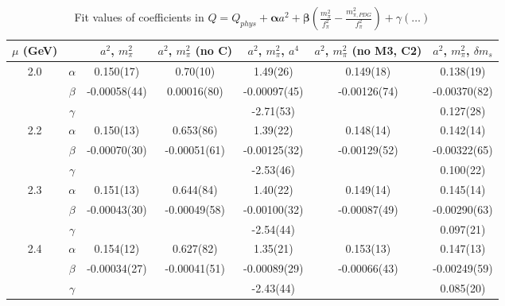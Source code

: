\documentclass[12pt]{extarticle}
\begin{document}
\begin{table}[h!]
\begin{center}
\begin{tabular}{|c c|c|c|c|c|c|}
\hline
$\mu$ (GeV) &  & $a^2$, $m_\pi^2$& $a^2$, $m_\pi^2$ (no C)& $a^2$, $m_\pi^2$, $a^4$& $a^2$, $m_\pi^2$ (no M3, C2)& $a^2$, $m_\pi^2$, $\delta m_s$\\
\hline
\multirow{3}{0.5in}{2.0} & $\alpha$ & 0.150(17)& 0.70(10)& 1.49(26)& 0.149(18)& 0.138(19)\\
 & $\beta$ & -0.00058(44)& 0.00016(80)& -0.00097(45)& -0.00126(74)& -0.00370(82)\\
 & $\gamma$ &  &  & -2.71(53)&  & 0.127(28)\\
\hline
\multirow{3}{0.5in}{2.2} & $\alpha$ & 0.150(13)& 0.653(86)& 1.39(22)& 0.148(14)& 0.142(14)\\
 & $\beta$ & -0.00070(30)& -0.00051(61)& -0.00125(32)& -0.00129(52)& -0.00322(65)\\
 & $\gamma$ &  &  & -2.53(46)&  & 0.100(22)\\
\hline
\multirow{3}{0.5in}{2.3} & $\alpha$ & 0.151(13)& 0.644(84)& 1.40(22)& 0.149(14)& 0.145(14)\\
 & $\beta$ & -0.00043(30)& -0.00049(58)& -0.00100(32)& -0.00087(49)& -0.00290(63)\\
 & $\gamma$ &  &  & -2.54(44)&  & 0.097(21)\\
\hline
\multirow{3}{0.5in}{2.4} & $\alpha$ & 0.154(12)& 0.627(82)& 1.35(21)& 0.153(13)& 0.147(13)\\
 & $\beta$ & -0.00034(27)& -0.00041(51)& -0.00089(29)& -0.00066(43)& -0.00249(59)\\
 & $\gamma$ &  &  & -2.43(44)&  & 0.085(20)\\
\hline
\end{tabular}
\caption{Fit values of coefficients in $Q = Q_{phys} + \mathbf{\alpha} a^2 + \mathbf{\beta}\left(\frac{m_\pi^2}{f_\pi^2}-\frac{m_{\pi,PDG}^2}{f_\pi^2}\right) + \gamma(\ldots)$}
\end{center}
\end{table}




















\clearpage
\end{document}
